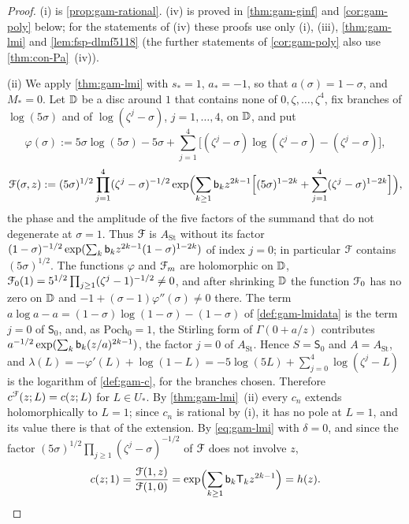 \begin{proof}
(i) is \cref{prop:gam-rational}. (iv) is proved in \cref{thm:gam-ginf} and \cref{cor:gam-poly} below; for the statements of (iv) these proofs use only (i), (iii), \cref{thm:gam-lmi} and \cref{lem:fsp-dlmf5118} (the further statements of \cref{cor:gam-poly} also use \cref{thm:con-Pa}~(iv)).

(ii) We apply \cref{thm:gam-lmi} with $s_*=1$, $a_*=-1$, so that $a(\sigma)=1-\sigma$, and $M_*=0$. Let $\mathbb{D}$ be a disc around $1$ that contains none of $0,\zeta,\dots,\zeta^4$, fix branches of $\log(5\sigma)$ and of $\log(\zeta^j-\sigma)$, $j=1,\dots,4$, on $\mathbb{D}$, and put
\[
\varphi(\sigma):=5\sigma\log(5\sigma)-5\sigma+\sum_{j=1}^4\bigl[(\zeta^j-\sigma)\log(\zeta^j-\sigma)-(\zeta^j-\sigma)\bigr],
\]
\[
\mathcal{F}(\sigma,z):=(5\sigma)^{1/2}\prod_{j=1}^4(\zeta^j-\sigma)^{-1/2}\exp\Bigl(\sum_{k\geq 1}\mathsf{b}_kz^{2k-1}\Bigl[(5\sigma)^{1-2k}+\sum_{j=1}^4(\zeta^j-\sigma)^{1-2k}\Bigr]\Bigr),
\]
the phase and the amplitude of the five factors of the summand that do not degenerate at $\sigma=1$. Thus $\mathcal{F}$ is $A_{\mathrm{St}}$ without its factor $(1-\sigma)^{-1/2}\exp(\sum_k\mathsf{b}_kz^{2k-1}(1-\sigma)^{1-2k})$ of index $j=0$; in particular $\mathcal{F}$ contains $(5\sigma)^{1/2}$. The functions $\varphi$ and $\mathcal{F}_m$ are holomorphic on $\mathbb{D}$, $\mathcal{F}_0(1)=5^{1/2}\prod_{j\geq 1}(\zeta^j-1)^{-1/2}\neq 0$, and after shrinking $\mathbb{D}$ the function $\mathcal{F}_0$ has no zero on $\mathbb{D}$ and $-1+(\sigma-1)\varphi''(\sigma)\neq 0$ there. The term $a\log a-a=(1-\sigma)\log(1-\sigma)-(1-\sigma)$ of \cref{def:gam-lmidata} is the term $j=0$ of $\mathsf S_0$, and, as $\mathrm{Poch}_0=1$, the Stirling form of $\Gamma(0+a/z)$ contributes $a^{-1/2}\exp(\sum_k\mathsf{b}_k(z/a)^{2k-1})$, the factor $j=0$ of $A_{\mathrm{St}}$. Hence $S=\mathsf S_0$ and $A=A_{\mathrm{St}}$, and $\lambda(L)=-\varphi'(L)+\log(1-L)=-5\log(5L)+\sum_{j=0}^4\log(\zeta^j-L)$ is the logarithm of \cref{def:gam-c}, for the branches chosen. Therefore $c^{\mathcal{F}}(z;L)=c(z;L)$ for $L\in U_*$. By \cref{thm:gam-lmi}~(ii) every $c_n$ extends holomorphically to $L=1$; since $c_n$ is rational by (i), it has no pole at $L=1$, and its value there is that of the extension. By \eqref{eq:gam-lmi} with $\delta=0$, and since the factor $(5\sigma)^{1/2}\prod_{j\geq 1}(\zeta^j-\sigma)^{-1/2}$ of $\mathcal{F}$ does not involve $z$,
\[
c(z;1)=\frac{\mathcal{F}(1,z)}{\mathcal{F}(1,0)}=\exp\Bigl(\sum_{k\geq 1}\mathsf{b}_k\mathsf T_kz^{2k-1}\Bigr)=h(z).
\]


\end{proof}
